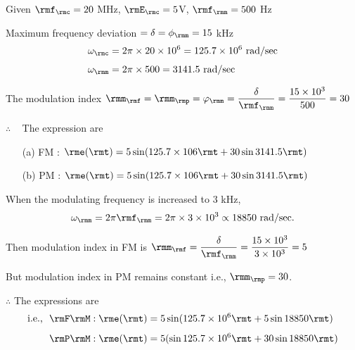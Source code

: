\begin{solution}
Given $\rmf_\rmc = 20$ MHz, $\rmE_\rmc = 5$V, $\rmf_\rmm = 500$ Hz

\smallskip
Maximum frequency deviation $= \delta = \phi_\rmm = 15$ kHz
\begin{align*}
\omega_\rmc & = 2 \pi \times 20 \times 10^6 = 125.7 \times 10^6 \text{
rad/sec}\\[4pt]
\omega_\rmm & = 2 \pi \times 500 = 3141.5 \text{ rad/sec}
\end{align*}

The modulation index $\rmm_\rmf = \rmm_\rmp = \varphi_\rmm = \dfrac{\delta}{\rmf_\rmm}
= \dfrac{15 \times 10^3}{500} = 30$

\smallskip
$\therefore$ ~ The expression are
\begin{itemize}
\item[(a)] FM : $\rme(\rmt) = 5 \sin (125.7 \times 106 \rmt + 30 \sin 3141.5 \rmt)$

\item[(b)] PM : $\rme(\rmt) = 5 \sin (125.7 \times 106 \rmt + 30 \sin 3141.5 \rmt)$
\end{itemize}

When the modulating frequency is increased to 3 kHz,
$$
\omega_\rmm = 2 \pi \rmf_\rmm = 2\pi \times 3 \times 10^3 \propto 18850 \text{ rad/sec.}
$$

Then modulation index in FM is $\rmm_\rmf = \dfrac{\delta}{\rmf_\rmm}
= \dfrac{15 \times 10^3}{3 \times 10^3} = 5$

\smallskip
But modulation index in PM remains constant i.e., $\rmm_\rmp = 30$.

\smallskip
$\therefore$ The expressions are
\begin{align*}
\text{i.e., ~} \rmF\rmM : \rme(\rmt) & = 5 \sin (125.7 \times 10^6  \rmt + 5 \sin 18850 \rmt)\\[4pt]
\rmP\rmM : \rme(\rmt) & = 5 (\sin 125.7 \times 10^6 \rmt + 30 \sin 18850 \rmt)
\end{align*}
\end{solution}

\eject

